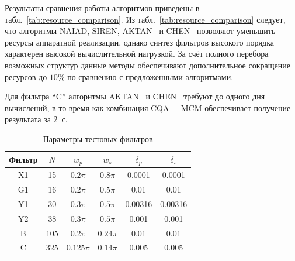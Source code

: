 Результаты сравнения работы алгоритмов приведены в табл.~\ref{tab:resource_comparison}. Из табл.~\ref{tab:resource_comparison} следует, что алгоритмы NAIAD, SIREN, AKTAN~\cite{Aktan2008} и CHEN~\cite{Chen1999} позволяют уменьшить ресурсы аппаратной реализации, однако синтез фильтров высокого порядка характерен высокой вычислительной нагрузкой. За счёт полного перебора возможных структур данные методы обеспечивают дополнительное сокращение ресурсов до $10\%$ по сравнению с предложенными алгоритмами.

Для фильтра ``C'' алгоритмы AKTAN~\cite{Aktan2008} и CHEN~\cite{Chen1999} требуют до одного дня вычислений, в то время как комбинация CQA + MCM обеспечивает получение результата за $2$~с.

\begin{table}[htbp]
	\centering
	\caption{Параметры тестовых фильтров}
	\label{tab:test_filters}
	\begin{tabular}{|c|c|c|c|c|c|}
		\hline
		Фильтр & $N$ & $w_p$ & $w_s$ & $\delta_p$ & $\delta_s$ \\
		\hline
		X1 & 15  & $0.2\pi$   & $0.8\pi$   & 0.0001  & 0.0001 \\
		\hline
		G1 & 16  & $0.2\pi$   & $0.5\pi$   & 0.01    & 0.01 \\
		\hline
		Y1 & 30  & $0.3\pi$   & $0.5\pi$   & 0.00316 & 0.00316 \\
		\hline
		Y2 & 38  & $0.3\pi$   & $0.5\pi$   & 0.001   & 0.001 \\
		\hline
		B  & 105 & $0.2\pi$   & $0.24\pi$  & 0.01    & 0.01 \\
		\hline
		C  & 325 & $0.125\pi$ & $0.14\pi$  & 0.005   & 0.005 \\
		\hline
	\end{tabular}
\end{table}

